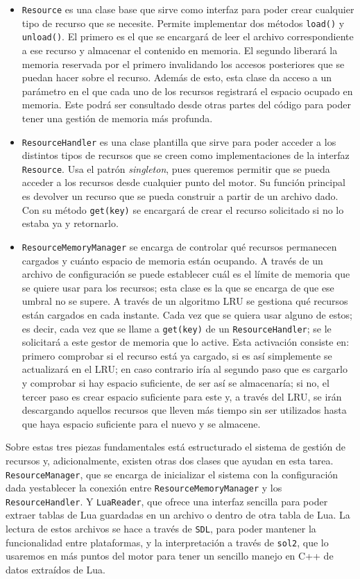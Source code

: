 \begin{itemize}
	\item \texttt{Resource} es una clase base que sirve como interfaz para poder crear cualquier tipo de recurso que se necesite. Permite implementar dos métodos \texttt{load()} y \texttt{unload()}. El primero es el que se encargará de leer el archivo correspondiente a ese recurso y almacenar el contenido en memoria. El segundo liberará la memoria reservada por el primero invalidando los accesos posteriores que se puedan hacer sobre el recurso. Además de esto, esta clase da acceso a un parámetro en el que cada uno de los recursos registrará el espacio ocupado en memoria. Este podrá ser consultado desde otras partes del código para poder tener una gestión de memoria más profunda.
	\item \texttt{ResourceHandler} es una clase plantilla que sirve para poder acceder a los distintos tipos de recursos que se creen como implementaciones de la interfaz \texttt{Resource}. Usa el patrón \textit{singleton}, pues queremos permitir que se pueda acceder a los recursos desde cualquier punto del motor. Su función principal es devolver un recurso que se pueda construir a partir de un archivo dado. Con su método \texttt{get(key)} se encargará de crear el recurso solicitado si no lo estaba ya y retornarlo. 
	\item \texttt{ResourceMemoryManager} se encarga de controlar qué recursos permanecen cargados y cuánto espacio de memoria están ocupando. A través de un archivo de configuración se puede establecer cuál es el límite de memoria que se quiere usar para los recursos; esta clase es la que se encarga de que ese umbral no se supere. A través de un algoritmo LRU se gestiona qué recursos están cargados en cada instante. Cada vez que se quiera usar alguno de estos; es decir, cada vez que se llame a \texttt{get(key)} de un \texttt{ResourceHandler}; se le solicitará a este gestor de memoria que lo active. Esta activación consiste en: primero comprobar si el recurso está ya cargado, si es así simplemente se actualizará en el LRU; en caso contrario iría al segundo paso que es cargarlo y comprobar si hay espacio suficiente, de ser así se almacenaría; si no, el tercer paso es crear espacio suficiente para este y, a través del LRU, se irán descargando aquellos recursos que lleven más tiempo sin ser utilizados hasta que haya espacio suficiente para el nuevo y se almacene.
\end{itemize}

\medskip

Sobre estas tres piezas fundamentales está estructurado el sistema de gestión de recursos y, adicionalmente, existen otras dos clases que ayudan en esta tarea. \texttt{ResourceManager}, que se encarga de inicializar el sistema con la configuración dada yestablecer la conexión entre \texttt{ResourceMemoryManager} y los \texttt{ResourceHandler}. Y \texttt{LuaReader}, que ofrece una interfaz sencilla para poder extraer tablas de Lua guardadas en un archivo o dentro de otra tabla de Lua. La lectura de estos archivos se hace a través de \texttt{SDL}, para poder mantener la funcionalidad entre plataformas, y la interpretación a través de \texttt{sol2}, que lo usaremos en más puntos del motor para tener un sencillo manejo en C++ de datos extraídos de Lua.

